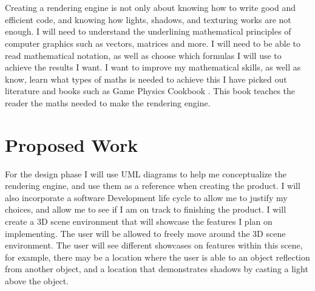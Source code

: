 \documentclass[]{article}
\begin{document}
\\\\
Creating a rendering engine is not only about knowing how to write good and efficient code, and knowing how lights, shadows, and texturing works are not enough. I will need to understand the underlining mathematical principles of computer graphics such as vectors, matrices and more. I will need to be able to read mathematical notation, as well as choose which formulas I will use to achieve the results I want.
I want to improve my mathematical skills, as well as know, learn what types of maths is needed to achieve this I have picked out literature and books such as  Game Physics Cookbook \cite{gamephysics}. This book teaches the reader the maths needed to make the rendering engine.

\section{Proposed Work}
For the design phase I will use UML diagrams to help me conceptualize the rendering engine, and use them as a reference when creating the product. I will also incorporate a software Development life cycle to allow me to justify my choices, and allow me to see if I am on track to finishing the product.
I will create a 3D scene environment that will showcase the features I plan on implementing. The user will be allowed to freely move around the 3D scene environment. The user will see different showcases on features within this scene, for example, there may be a location where the user is able to an object reflection from another object, and a location that demonstrates shadows by casting a light above the object.
\end{document}

